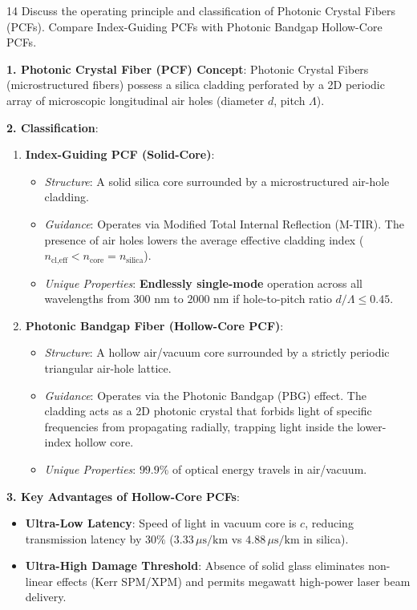 \begin{theoryq}{14}
Discuss the operating principle and classification of Photonic Crystal Fibers (PCFs). Compare Index-Guiding PCFs with Photonic Bandgap Hollow-Core PCFs.
\end{theoryq}
\begin{theorysol}
\textbf{1. Photonic Crystal Fiber (PCF) Concept}:
Photonic Crystal Fibers (microstructured fibers) possess a silica cladding perforated by a 2D periodic array of microscopic longitudinal air holes (diameter $d$, pitch $\Lambda$).

\textbf{2. Classification}:
\begin{enumerate}
    \item \textbf{Index-Guiding PCF (Solid-Core)}:
    \begin{itemize}
        \item \textit{Structure}: A solid silica core surrounded by a microstructured air-hole cladding.
        \item \textit{Guidance}: Operates via Modified Total Internal Reflection (M-TIR). The presence of air holes lowers the average effective cladding index ($n_{\text{cl,eff}} < n_{\text{core}} = n_{\text{silica}}$).
        \item \textit{Unique Properties}: \textbf{Endlessly single-mode} operation across all wavelengths from $300\text{ nm}$ to $2000\text{ nm}$ if hole-to-pitch ratio $d/\Lambda \le 0.45$.
    \end{itemize}
    \item \textbf{Photonic Bandgap Fiber (Hollow-Core PCF)}:
    \begin{itemize}
        \item \textit{Structure}: A hollow air/vacuum core surrounded by a strictly periodic triangular air-hole lattice.
        \item \textit{Guidance}: Operates via the Photonic Bandgap (PBG) effect. The cladding acts as a 2D photonic crystal that forbids light of specific frequencies from propagating radially, trapping light inside the lower-index hollow core.
        \item \textit{Unique Properties}: $99.9\%$ of optical energy travels in air/vacuum.
    \end{itemize}
\end{enumerate}

\textbf{3. Key Advantages of Hollow-Core PCFs}:
\begin{itemize}
    \item \textbf{Ultra-Low Latency}: Speed of light in vacuum core is $c$, reducing transmission latency by $30\%$ ($3.33\,\mu\text{s/km}$ vs $4.88\,\mu\text{s/km}$ in silica).
    \item \textbf{Ultra-High Damage Threshold}: Absence of solid glass eliminates non-linear effects (Kerr SPM/XPM) and permits megawatt high-power laser beam delivery.
\end{itemize}
\end{theorysol}
\vspace{4mm}

